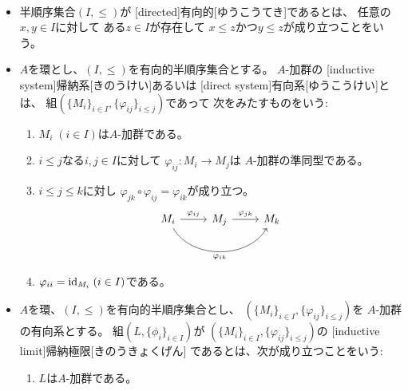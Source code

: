 \documentclass[report]{jlreq}
\begin{document}
\begin{definition}[帰納極限]
    ~
    \begin{itemize}
        \item 半順序集合$(I, \le)$が
            [directed]{有向的}[ゆうこうてき]であるとは、
            任意の$x, y \in I$に対して
            ある$z \in I$が存在して
            $x \le z$かつ$y \le z$が成り立つことをいう。
        \item $A$を環とし、$(I, \le)$を有向的半順序集合とする。
            $A$-加群の
            [inductive system]{帰納系}[きのうけい]あるいは
            [direct system]{有向系}[ゆうこうけい]とは、
            組$(\{ M_i \}_{i \in I}, \{ \varphi_{ij} \}_{i \le j})$であって
            次をみたすものをいう:
            \begin{enumerate}
                \item $M_i \; (i \in I)$は$A$-加群である。
                \item $i \le j$なる$i, j \in I$に対して
                    $\varphi_{ij} \colon M_i \to M_j$は
                    $A$-加群の準同型である。
                \item $i \le j \le k$に対し
                    $\varphi_{jk} \circ \varphi_{ij} = \varphi_{ik}$が成り立つ。
                    \begin{equation}
                        \begin{tikzcd}
                            M_i \ar{r}{\varphi_{ij}}
                                \ar[bend right=60]{rr}[swap]{\varphi_{ik}}
                                & M_j \ar{r}{\varphi_{jk}}
                                & M_k
                        \end{tikzcd}
                    \end{equation}
                \item $\varphi_{ii} = \mathrm{id}_{M_i} \; (i \in I)$である。
            \end{enumerate}
        \item $A$を環、$(I, \le)$を有向的半順序集合とし、
            $(\{ M_i \}_{i \in I}, \{ \varphi_{ij} \}_{i \le j})$を
            $A$-加群の有向系とする。
            組$(L, \{ \phi_i \}_{i \in I})$が
            $(\{ M_i \}_{i \in I}, \{ \varphi_{ij} \}_{i \le j})$の
            [inductive limit]{帰納極限}[きのうきょくげん]
            であるとは、次が成り立つことをいう:
            \begin{enumerate}
                \item $L$は$A$-加群である。

\end{enumerate}
\end{itemize}
\end{definition}
\end{document}
